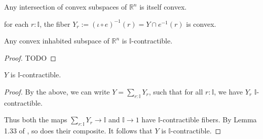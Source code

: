 \documentclass{../util/zariski}
\begin{document}
\begin{remark}
  Any intersection of convex subspaces of $\mathbb R^n$ is itself convex. 
\end{remark}
\begin{corollary}
  for each $r:\mathbb I$, the fiber 
  $Y_r:=(\iota \circ e)^{-1}(r) = Y\cap e^{-1}(r)$ is convex. 
\end{corollary}
\begin{lemma}
  Any convex inhabited subspace of $\mathbb R^n$ is $\mathbb I$-contractible. 
\end{lemma} 
\begin{proof}
  TODO
\end{proof}
\begin{theorem}
  $Y$ is $\mathbb I$-contractible. 
\end{theorem}
\begin{proof}
  By the above, we can write $Y = \sum\limits_{r:\mathbb I} Y_r$, 
  such that for all $r:\mathbb I$, we have 
  $Y_r$ $\mathbb I$-contractible. 

  Thus both the maps $\sum\limits_{r:\mathbb I} Y_r \to \mathbb I$ and 
  $\mathbb I \to 1$ have $\mathbb I$-contractible fibers. 
  By Lemma 1.33 of \cite{modalities}, so does their composite. 
  It follows that $Y$ is $\mathbb I$-contractible. 
\end{proof}
\end{document}
